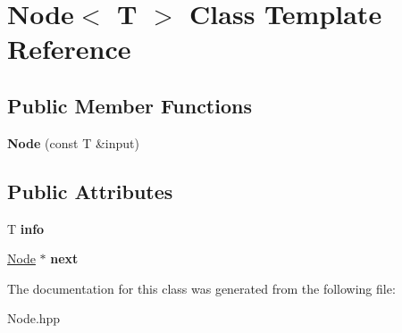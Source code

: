 \hypertarget{class_node}{}\section{Node$<$ T $>$ Class Template Reference}
\label{class_node}
\subsection*{Public Member Functions}
\begin{DoxyCompactItemize}
\item 
\mbox{\label{class_node_ac52007dec49c7147eb91efb6c3cfc583}} 
{\bfseries Node} (const T \&input)
\end{DoxyCompactItemize}
\subsection*{Public Attributes}
\begin{DoxyCompactItemize}
\item 
\mbox{\label{class_node_a21995784db5e7ad18061f631c5875635}} 
T {\bfseries info}
\item 
\mbox{\label{class_node_ac1c0563946c59c36bddde431b4adb00b}} 
\mbox{\hyperlink{class_node}{Node}} $\ast$ {\bfseries next}
\end{DoxyCompactItemize}


The documentation for this class was generated from the following file\+:\begin{DoxyCompactItemize}
\item 
Node.\+hpp\end{DoxyCompactItemize}
